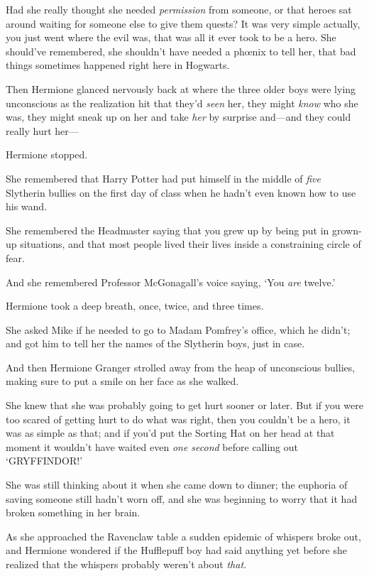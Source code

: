 Had she really thought she needed \emph{permission} from someone, or that heroes sat around waiting for someone else to give them quests? It was very simple actually, you just went where the evil was, that was all it ever took to be a hero. She should’ve remembered, she shouldn’t have needed a phœnix to tell her, that bad things sometimes happened right here in Hogwarts.

Then Hermione glanced nervously back at where the three older boys were lying unconscious as the realization hit that they’d \emph{seen} her, they might \emph{know} who she was, they might sneak up on her and take \emph{her} by surprise and—and they could really hurt her—

Hermione stopped.

She remembered that Harry Potter had put himself in the middle of \emph{five} Slytherin bullies on the first day of class when he hadn’t even known how to use his wand.

She remembered the Headmaster saying that you grew up by being put in grown-up situations, and that most people lived their lives inside a constraining circle of fear.

And she remembered Professor McGonagall’s voice saying, ‘You \emph{are} twelve.’

Hermione took a deep breath, once, twice, and three times.

She asked Mike if he needed to go to Madam Pomfrey’s office, which he didn’t; and got him to tell her the names of the Slytherin boys, just in case.

And then Hermione Granger strolled away from the heap of unconscious bullies, making sure to put a smile on her face as she walked.

She knew that she was probably going to get hurt sooner or later. But if you were too scared of getting hurt to do what was right, then you couldn’t be a hero, it was as simple as that; and if you’d put the Sorting Hat on her head at that moment it wouldn’t have waited even \emph{one second} before calling out ‘GRYFFINDOR!’

\later

She was still thinking about it when she came down to dinner; the euphoria of saving someone still hadn’t worn off, and she was beginning to worry that it had broken something in her brain.

As she approached the Ravenclaw table a sudden epidemic of whispers broke out, and Hermione wondered if the Hufflepuff boy had said anything yet before she realized that the whispers probably weren’t about \emph{that.}

